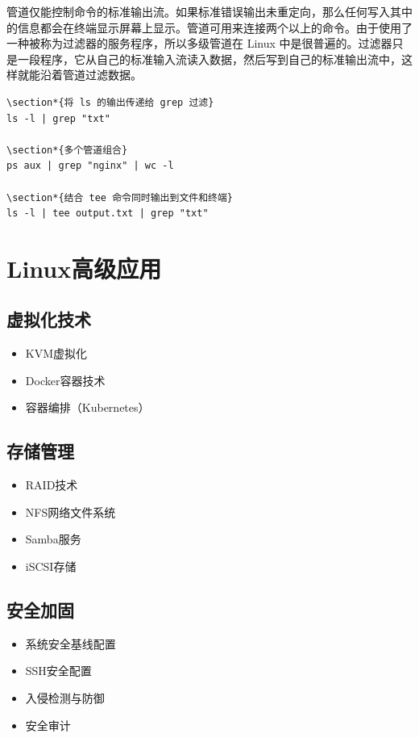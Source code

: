 \documentclass[12pt,UTF8]{ctexbook}
\begin{document}
管道仅能控制命令的标准输出流。如果标准错误输出未重定向，那么任何写入其中的信息都会在终端显示屏幕上显示。管道可用来连接两个以上的命令。由于使用了一种被称为过滤器的服务程序，所以多级管道在 Linux 中是很普遍的。过滤器只是一段程序，它从自己的标准输入流读入数据，然后写到自己的标准输出流中，这样就能沿着管道过滤数据。
\begin{verbatim}
\section*{将 ls 的输出传递给 grep 过滤}
ls -l | grep "txt"

\section*{多个管道组合}
ps aux | grep "nginx" | wc -l

\section*{结合 tee 命令同时输出到文件和终端}
ls -l | tee output.txt | grep "txt"
\end{verbatim}

\chapter{Linux高级应用}

\section{虚拟化技术}
\begin{itemize}
    \item KVM虚拟化
    \item Docker容器技术
    \item 容器编排（Kubernetes）
\end{itemize}

\section{存储管理}
\begin{itemize}
    \item RAID技术
    \item NFS网络文件系统
    \item Samba服务
    \item iSCSI存储
\end{itemize}

\section{安全加固}
\begin{itemize}
    \item 系统安全基线配置
    \item SSH安全配置
    \item 入侵检测与防御
    \item 安全审计
\end{itemize}
\end{document}
